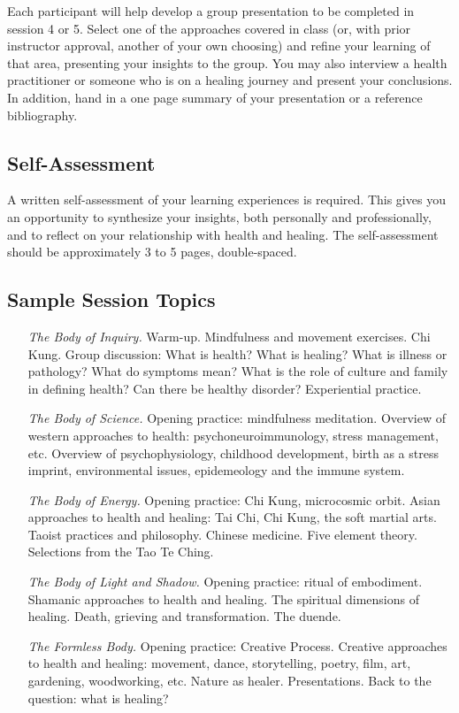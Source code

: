 \documentclass[10pt,DIV09,letterpaper,oneside,headsepline]{scrreprt}
\begin{document}
Each participant will help develop a group presentation to be completed in session 4 or 5. Select one of the approaches covered in class (or, with prior instructor approval, another of your own choosing) and refine your learning of that area, presenting your insights to the group. You may also interview a health practitioner or someone who is on a healing journey and present your conclusions. In addition, hand in a one page summary of your presentation or a reference bibliography.

\subsection{Self-Assessment}

A written self-assessment of your learning experiences is required. This gives you an opportunity to synthesize your insights, both personally and professionally, and to reflect on your relationship with health and healing. The self-assessment should be approximately 3 to 5 pages, double-spaced.

\subsection{Sample Session Topics}

\begin{itemize}

\item [\textit{The Body of Inquiry.}]
Warm-up. Mindfulness and movement exercises. Chi Kung. Group discussion: What is health? What is healing? What is illness or pathology? What do symptoms mean? What is the role of culture and family in defining health? Can there be healthy disorder? Experiential practice. 

\item [\textit{The Body of Science.}]
Opening practice: mindfulness meditation. Overview of western approaches to health: psychoneuroimmunology, stress management, etc. Overview of psychophysiology, childhood development, birth as a stress imprint, environmental issues, epidemeology and the immune system.

\item [\textit{The Body of Energy.}]
Opening practice: Chi Kung, microcosmic orbit. Asian approaches to health and healing: Tai Chi, Chi Kung, the soft martial arts. Taoist practices and philosophy. Chinese medicine. Five element theory. Selections from the Tao Te Ching.

\item [\textit{The Body of Light and Shadow.}]
Opening practice: ritual of embodiment. Shamanic approaches to health and healing. The spiritual dimensions of healing. Death, grieving and transformation. The duende.

\item [\textit{The Formless Body.}]
Opening practice: Creative Process. Creative approaches to health and healing: movement, dance, storytelling, poetry, film, art, gardening, woodworking, etc. Nature as healer. Presentations. Back to the question: what is healing?

\end{itemize}
\end{document}
